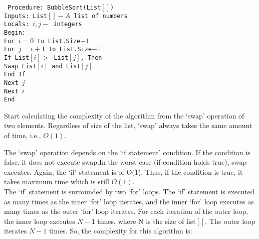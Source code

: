 \documentclass[12pt]{article}
\begin{document}
\texttt{
\hspace*{1.5cm} Procedure: BubbleSort(List$[ ]$)\\
\hspace*{2cm} Inputs: List$[ ] - A$ list of numbers \\
\hspace*{2cm} Locals: $i, j -$ integers \\
\hspace*{2cm} Begin:\\
\hspace*{2.5cm} For $i = 0$ to List.Size$-1$ \\
\hspace*{3cm} For $j = i + 1$ to List.Size$-1$ \\
\hspace*{3.5cm} If List$[i] >$ List$[j]$, Then \\
\hspace*{4cm} Swap List$[i]$ and List$[j]$ \\
\hspace*{3.5cm} End If \\
\hspace*{3cm} Next $j$ \\
\hspace*{2.5cm} Next $i$ \\
\hspace*{2cm} End \\
}

\hspace*{0.5cm} Start calculating the complexity of the algorithm from the ‘swap’ operation of two elements.
Regardless of size of the list, ‘swap’ always takes the same amount of time, i.e., $O(1)$.

 The ‘swap’ operation depends on the ‘if statement’ condition. If the condition is false, it does not execute swap.In
the worst case (if condition holds true), swap executes. Again, the ‘if’ statement is of O(1). Thus, if the
condition is true, it takes maximum time which is still $O(1)$.\\
\hspace*{0.5cm} The ‘if’ statement is surrounded by two ‘for’ loops. The ‘if’ statement is executed as many times
as the inner ‘for’ loop iterates, and the inner ‘for’ loop executes as many times as the outer ‘for’ loop
iterates. For each iteration of the outer loop, the inner loop executes $N - 1$ times, where N is the size of
list$[ ]$. The outer loop iterates $N - 1$ times. So, the complexity for this algorithm is:\\
\end{document}
